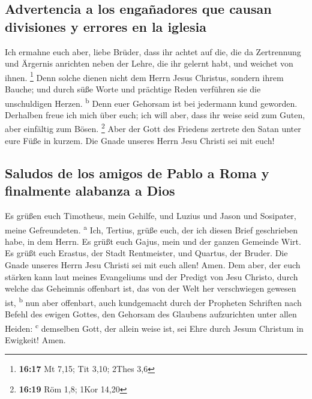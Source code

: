 \hypertarget{advertencia-a-los-engauxf1adores-que-causan-divisiones-y-errores-en-la-iglesia}{%
\subsection{Advertencia a los engañadores que causan divisiones y
errores en la
iglesia}\label{advertencia-a-los-engauxf1adores-que-causan-divisiones-y-errores-en-la-iglesia}}

 Ich ermahne euch aber, liebe Brüder, dass ihr achtet auf
die, die da Zertrennung und Ärgernis anrichten neben der Lehre, die ihr
gelernt habt, und weichet von ihnen. \footnote{\textbf{16:17} Mt 7,15;
  Tit 3,10; 2Thes 3,6}  Denn solche dienen nicht dem
Herrn Jesus Christus, sondern ihrem Bauche; und durch süße Worte und
prächtige Reden verführen sie die unschuldigen Herzen.
\textsuperscript{b}  Denn euer Gehorsam ist bei jedermann
kund geworden. Derhalben freue ich mich über euch; ich will aber, dass
ihr weise seid zum Guten, aber einfältig zum Bösen. \footnote{\textbf{16:19}
  Röm 1,8; 1Kor 14,20}  Aber der Gott des Friedens
zertrete den Satan unter eure Füße in kurzem. Die Gnade unseres Herrn
Jesu Christi sei mit euch!

\hypertarget{saludos-de-los-amigos-de-pablo-a-roma-y-finalmente-alabanza-a-dios}{%
\subsection{Saludos de los amigos de Pablo a Roma y finalmente alabanza
a
Dios}\label{saludos-de-los-amigos-de-pablo-a-roma-y-finalmente-alabanza-a-dios}}

 Es grüßen euch Timotheus, mein Gehilfe, und Luzius und
Jason und Sosipater, meine Gefreundeten. \textsuperscript{a}
 Ich, Tertius, grüße euch, der ich diesen Brief
geschrieben habe, in dem Herrn.  Es grüßt euch Gajus,
mein und der ganzen Gemeinde Wirt. Es grüßt euch Erastus, der Stadt
Rentmeister, und Quartus, der Bruder.  Die Gnade unseres
Herrn Jesu Christi sei mit euch allen! Amen.  Dem aber,
der euch stärken kann laut meines Evangeliums und der Predigt von Jesu
Christo, durch welche das Geheimnis offenbart ist, das von der Welt her
verschwiegen gewesen ist, \textsuperscript{b}  nun aber
offenbart, auch kundgemacht durch der Propheten Schriften nach Befehl
des ewigen Gottes, den Gehorsam des Glaubens aufzurichten unter allen
Heiden: \textsuperscript{c}  demselben Gott, der allein
weise ist, sei Ehre durch Jesum Christum in Ewigkeit! Amen.
